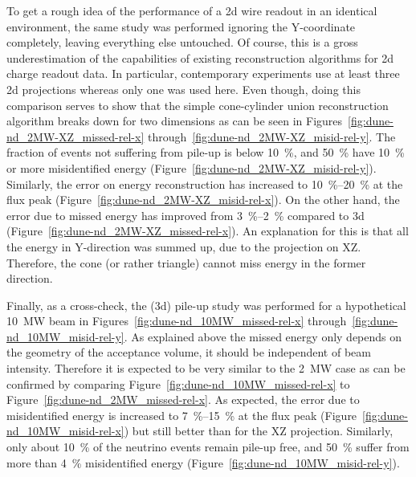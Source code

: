 To get a rough idea of the performance of a \gls{2d} wire readout in an identical environment, the same study was performed ignoring the Y-coordinate completely, leaving everything else untouched.
Of course, this is a gross underestimation of the capabilities of existing reconstruction algorithms for \gls{2d} charge readout data.
In particular, contemporary experiments use at least three \gls{2d} projections whereas only one was used here.
Even though, doing this comparison serves to show that the simple cone-cylinder union reconstruction algorithm breaks down for two dimensions as can be seen in Figures~\ref{fig:dune-nd_2MW-XZ_missed-rel-x} through~\ref{fig:dune-nd_2MW-XZ_misid-rel-y}.
The fraction of events not suffering from pile-up is below \SI{10}{\percent}, and \SI{50}{\percent} have \SI{10}{\percent} or more misidentified energy (Figure~\ref{fig:dune-nd_2MW-XZ_misid-rel-y}).
Similarly, the error on energy reconstruction has increased to \SIrange{10}{20}{\percent} at the flux peak (Figure~\ref{fig:dune-nd_2MW-XZ_misid-rel-x}).
On the other hand, the error due to missed energy has improved from \SIrange{3}{2}{\percent} compared to \gls{3d} (Figure~\ref{fig:dune-nd_2MW-XZ_missed-rel-x}).
An explanation for this is that all the energy in Y-direction was summed up, due to the projection on XZ.
Therefore, the cone (or rather triangle) cannot miss energy in the former direction.

Finally, as a cross-check, the (\gls{3d}) pile-up study was performed for a hypothetical \SI{10}{\mega\watt} beam in Figures~\ref{fig:dune-nd_10MW_missed-rel-x} through~\ref{fig:dune-nd_10MW_misid-rel-y}.
As explained above the missed energy only depends on the geometry of the acceptance volume, it should be independent of beam intensity.
Therefore it is expected to be very similar to the \SI{2}{\mega\watt} case as can be confirmed by comparing Figure~\ref{fig:dune-nd_10MW_missed-rel-x} to Figure~\ref{fig:dune-nd_2MW_missed-rel-x}.
As expected, the error due to misidentified energy is increased to \SIrange{7}{15}{\percent} at the flux peak (Figure~\ref{fig:dune-nd_10MW_misid-rel-x}) but still better than for the XZ projection.
Similarly, only about \SI{10}{\percent} of the neutrino events remain pile-up free, and \SI{50}{\percent} suffer from more than \SI{4}{\percent} misidentified energy (Figure~\ref{fig:dune-nd_10MW_misid-rel-y}).

